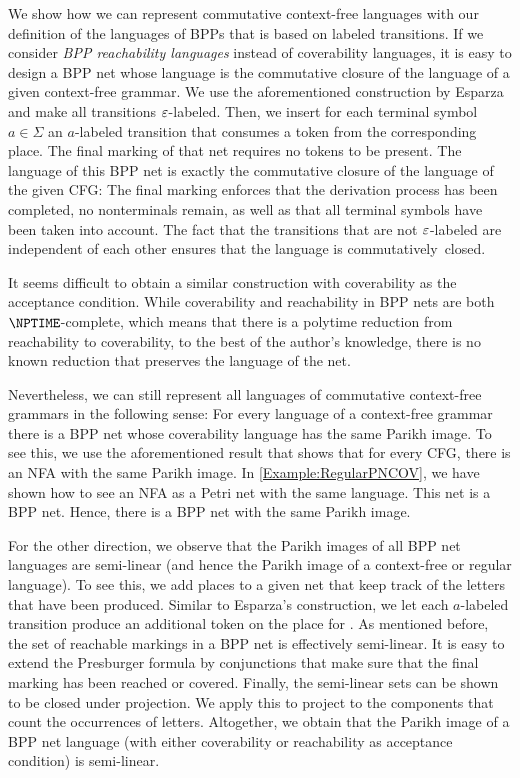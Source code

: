 \documentclass[../../diss.tex]{subfiles}
\begin{document}
We show how we can represent commutative context-free languages with our  definition of the languages of BPPs that is based on labeled transitions.
If we consider \emph{BPP reachability languages} instead of coverability languages, it is easy to design a BPP net whose language is the commutative closure of the language of a given context-free grammar.
We use the aforementioned construction by Esparza and make all transitions $\varepsilon$-labeled.
Then, we insert for each terminal symbol $a \in \Sigma$ an $a$-labeled transition that consumes a token from the corresponding place.
The final marking of that net requires no tokens to be present.
The language of this BPP net is exactly the commutative closure of the language of the given CFG:
The final marking enforces that the derivation process has been completed, \ie no nonterminals remain, as well as that all terminal symbols have been taken into account.
The fact that the transitions that are not $\varepsilon$-labeled are independent of each other ensures that the language is commutatively~closed.

It seems difficult to obtain a similar construction with coverability as the acceptance condition.
While coverability and reachability in BPP nets are both $\NPTIME$-complete, which means that there is a polytime reduction from reachability to coverability, to the best of the author's knowledge, there is no known reduction that preserves the language of the net.

Nevertheless, we can still represent all languages of commutative context-free grammars in the following sense:
For every language of a context-free grammar there is a BPP net whose coverability language has the same Parikh image.
To see this, we use the aforementioned result that shows that for every CFG, there is an NFA with the same Parikh image.
In \cref{Example:RegularPNCOV}, we have shown how to see an NFA as a Petri net with the same language.
This net is a BPP net.
Hence, there is a BPP net with the same Parikh image.

For the other direction, we observe that the Parikh images of all BPP net languages are semi-linear (and hence the Parikh image of a context-free or regular language).
To see this, we add places to a given net that keep track of the letters that have been produced.
Similar to Esparza's construction, we let each $a$-labeled transition produce an additional token on the place for .
As mentioned before, the set of reachable markings in a BPP net is effectively semi-linear.
It is easy to extend the Presburger formula by conjunctions that make sure that the final marking has been reached or covered.
Finally, the semi-linear sets can be shown to be closed under projection.
We apply this to project to the components that count the occurrences of letters.
Altogether, we obtain that the Parikh image of a BPP net language (with either coverability or reachability as acceptance condition) is semi-linear.
\end{document}

